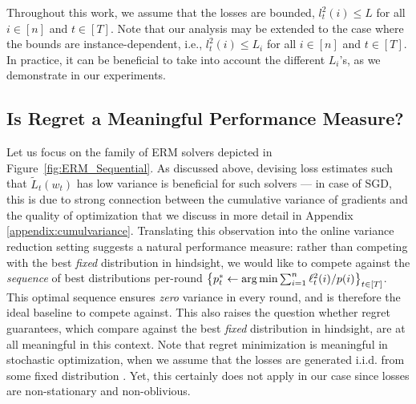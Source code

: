 Throughout this work, we assume that the losses are bounded, $l^2_t(i) \leq L$ for all  $i \in [n]$ and \linebreak $t \in [T]$.
Note that our analysis may be extended to the case where the bounds are  instance-dependent, i.e., $l^2_t(i) \leq L_i$ for all  $i \in [n]$ and $t \in [T]$. In practice, it can be beneficial to take into account the different $L_i$'s, as we demonstrate in our experiments.





\subsection{Is Regret  a Meaningful Performance Measure?} \label{sec:Why}
Let us focus on the family of ERM solvers  depicted in Figure~\ref{fig:ERM_Sequential}.
As  discussed above, devising loss estimates such that $\tilde{L}_t(w_t)$ has low variance is beneficial for such solvers --- in case of SGD, this is due to strong connection between the cumulative variance of gradients and the quality of optimization that we discuss in more detail in Appendix \ref{appendix:cumulvariance}.
Translating this observation into the online variance reduction setting  suggests a  natural performance measure:
rather than competing with the best \emph{fixed} distribution in hindsight, we would like to compete against the \emph{sequence} of best distributions per-round  $\left\{p^*_t\gets \operatorname*{arg\,min}\sum_{i=1}^n {\ell_t^2(i)}/{p(i)} \right\}_{t\in[T]}$.
This  optimal sequence ensures \emph{zero}  variance  in every round, and is therefore the ideal baseline to compete against.
This also raises the question whether regret guarantees, which  compare against  the best \emph{fixed} distribution in hindsight, are at all meaningful in this context. Note that regret minimization is meaningful in stochastic optimization, when we assume that the losses are generated i.i.d. from some fixed distribution \citep{cesa2004generalization}. Yet, this  certainly does not apply in our  case since  losses are non-stationary and  non-oblivious.

